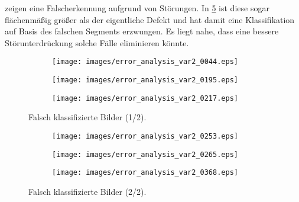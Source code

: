  zeigen eine Falscherkennung aufgrund von Störungen. In \cref{fig:error3} ist diese sogar flächenmäßig größer als der eigentliche Defekt und hat damit eine Klassifikation auf Basis des falschen Segments erzwungen. Es liegt nahe, dass eine bessere Störunterdrückung solche Fälle eliminieren könnte.

\begin{figure}[htbp]
    \centering
    \begin{subfigure}{\textwidth}
        \centering
        \texttt{[image: images/error\_analysis\_var2\_0044.eps]}
        \caption{\label{fig:error0}}
    \end{subfigure}
    \begin{subfigure}{\textwidth}
        \centering
        \texttt{[image: images/error\_analysis\_var2\_0195.eps]}
        \caption{\label{fig:error1}}
    \end{subfigure}
    \begin{subfigure}{\textwidth}
        \centering
        \texttt{[image: images/error\_analysis\_var2\_0217.eps]}
        \caption{\label{fig:error2}}
    \end{subfigure}
    \caption{Falsch klassifizierte Bilder (1/2).\label{fig:error_analysis1}}
\end{figure}

\begin{figure}[htbp]
    \centering
    \begin{subfigure}{\textwidth}
        \centering
        \texttt{[image: images/error\_analysis\_var2\_0253.eps]}
        \caption{\label{fig:error3}}
    \end{subfigure}
    \begin{subfigure}{\textwidth}
        \centering
        \texttt{[image: images/error\_analysis\_var2\_0265.eps]}
        \caption{\label{fig:error4}}
    \end{subfigure}
    \begin{subfigure}{\textwidth}
        \centering
        \texttt{[image: images/error\_analysis\_var2\_0368.eps]}
        \caption{\label{fig:error5}}
    \end{subfigure}
    \caption{Falsch klassifizierte Bilder (2/2).\label{fig:error_analysis2}}
\end{figure}
